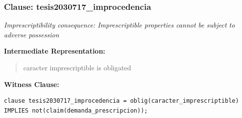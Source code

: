 \documentclass[11pt,a4paper]{article}
\begin{document}
\subsubsection{Clause: tesis2030717\_improcedencia}

\textit{Imprescriptibility consequence: Imprescriptible properties cannot be subject to adverse possession}

\textbf{Intermediate Representation:}

\begin{quote}
caracter imprescriptible is obligated
\end{quote}

\textbf{Witness Clause:}

\begin{lstlisting}[style=witnessstyle, language=Witness]
clause tesis2030717_improcedencia = oblig(caracter_imprescriptible) IMPLIES not(claim(demanda_prescripcion));
\end{lstlisting}

\newpage
\end{document}
